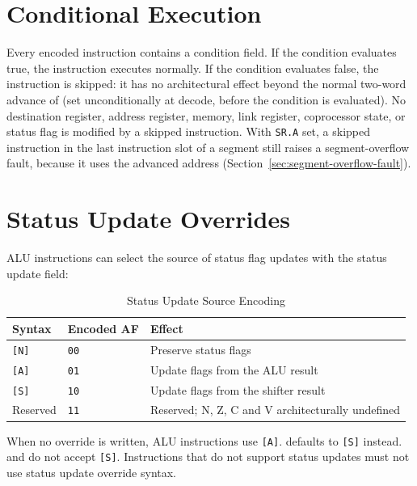 \section{Conditional Execution}

Every encoded instruction contains a condition field. If the condition evaluates true, the instruction executes
normally. If the condition evaluates false, the instruction is skipped: it has no architectural effect beyond the
normal two-word advance of  (set unconditionally at decode, before the condition is evaluated). No destination
register, address register, memory, link register, coprocessor state, or status flag is modified by a skipped
instruction. With \texttt{SR.A} set, a skipped instruction in the last instruction slot of a segment still raises a
segment-overflow fault, because it uses the advanced address (Section~\ref{sec:segment-overflow-fault}).

\section{Status Update Overrides}

ALU instructions can select the source of status flag updates with the status update field:

\begin{table}[H]
	\centering
	\begin{tabular}{lll}
		\toprule
		\textbf{Syntax} & \textbf{Encoded AF} & \textbf{Effect}                                   \\
		\midrule
		\texttt{[N]}    & \texttt{00}         & Preserve status flags                             \\
		\texttt{[A]}    & \texttt{01}         & Update flags from the ALU result                  \\
		\texttt{[S]}    & \texttt{10}         & Update flags from the shifter result              \\
		Reserved        & \texttt{11}         & Reserved; N, Z, C and V architecturally undefined \\
		\bottomrule
	\end{tabular}
	\caption{Status Update Source Encoding}
	\label{tab:status-update-source-encoding}
\end{table}

When no override is written, ALU instructions use \texttt{[A]}.  defaults to \texttt{[S]} instead.
 and  do not accept \texttt{[S]}. Instructions that do not support status updates must
not use status update override syntax.

